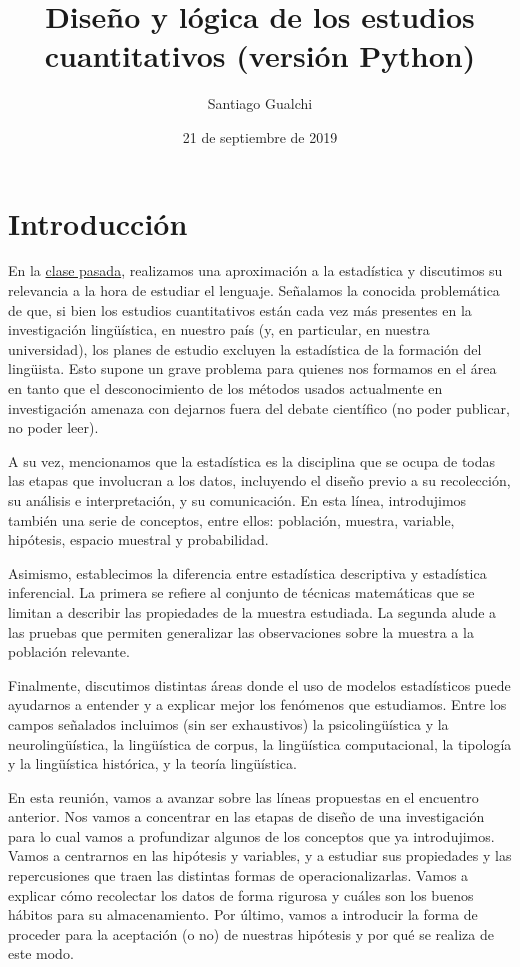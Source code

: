 \documentclass[12pt,spanish,a4paper,]{article}
\title{Diseño y lógica de los estudios cuantitativos (versión Python)}
\author{Santiago Gualchi}
\date{21 de septiembre de 2019}
\begin{document}
\maketitle

\hypertarget{introduccion}{%
\section{Introducción}\label{introduccion}}

En la
\href{https://drive.google.com/file/d/1vRmq8vyfwkgANQznM2oPuzhorcoIaSkZ/view?usp=sharing}{clase
pasada}, realizamos una aproximación a la estadística y discutimos su
relevancia a la hora de estudiar el lenguaje. Señalamos la conocida
problemática de que, si bien los estudios cuantitativos están cada vez
más presentes en la investigación lingüística, en nuestro país (y, en
particular, en nuestra universidad), los planes de estudio excluyen la
estadística de la formación del lingüista. Esto supone un grave problema
para quienes nos formamos en el área en tanto que el desconocimiento de
los métodos usados actualmente en investigación amenaza con dejarnos
fuera del debate científico (no poder publicar, no poder leer).

A su vez, mencionamos que la estadística es la disciplina que se ocupa
de todas las etapas que involucran a los datos, incluyendo el diseño
previo a su recolección, su análisis e interpretación, y su
comunicación. En esta línea, introdujimos también una serie de
conceptos, entre ellos: población, muestra, variable, hipótesis, espacio
muestral y probabilidad.

Asimismo, establecimos la diferencia entre estadística descriptiva y
estadística inferencial. La primera se refiere al conjunto de técnicas
matemáticas que se limitan a describir las propiedades de la muestra
estudiada. La segunda alude a las pruebas que permiten generalizar las
observaciones sobre la muestra a la población relevante.

Finalmente, discutimos distintas áreas donde el uso de modelos
estadísticos puede ayudarnos a entender y a explicar mejor los fenómenos
que estudiamos. Entre los campos señalados incluimos (sin ser
exhaustivos) la psicolingüística y la neurolingüística, la lingüística
de corpus, la lingüística computacional, la tipología y la lingüística
histórica, y la teoría lingüística.

En esta reunión, vamos a avanzar sobre las líneas propuestas en el
encuentro anterior. Nos vamos a concentrar en las etapas de diseño de
una investigación para lo cual vamos a profundizar algunos de los
conceptos que ya introdujimos. Vamos a centrarnos en las hipótesis y
variables, y a estudiar sus propiedades y las repercusiones que traen
las distintas formas de operacionalizarlas. Vamos a explicar cómo
recolectar los datos de forma rigurosa y cuáles son los buenos hábitos
para su almacenamiento. Por último, vamos a introducir la forma de
proceder para la aceptación (o no) de nuestras hipótesis y por qué se
realiza de este modo.
\end{document}
